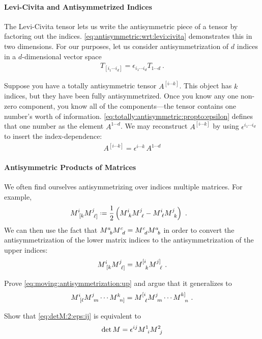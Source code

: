 \documentclass[12pt, oneside]{report}    %
\begin{document}
\paragraph{Levi-Civita and Antisymmetrized Indices}
The Levi-Civita tensor lets us write the antisymmetric piece of a tensor by factoring out the indices. \eqref{eq:antisymmetric:wrt:levi:civita} demonstrates this in two dimensions. For our purposes, let us consider antisymmetrization of $d$ indices in a $d$-dimensional vector space
\begin{align}
    T_{[i_1\cdots i_d]} = 
    \epsilon_{i_1\cdots i_d}
    T_{1\cdots d} \ .
    \label{eq:totally:antisymmetric:propto:epsilon}
\end{align}
\begin{example}\label{eg:pull:out:epsilon}
Suppose you have a totally antisymmetric tensor $A^{[i\cdots k]}$. This object has $k$ indices, but they have been fully antisymmetrized. Once you know any one non-zero component, you know all of the components---the tensor contains one number's worth of information. \eqref{eq:totally:antisymmetric:propto:epsilon} defines that one number as the element $A^{1\cdots d}$. We may reconstruct $A^{[i\cdots k]}$ by using $\epsilon^{i_1\cdots i_d}$ to insert the index-dependence:
\begin{align}
    A^{[i\cdots k]} = \epsilon^{i\cdots k} \, A^{1\cdots d}
\end{align}
\end{example}

\paragraph{Antisymmetric Products of Matrices}
We often find ourselves antisymmetrizing over indices multiple matrices. For example,
\begin{align}
    M\aij{i}{[k}M\aij{j}{\ell]} &\defeq
    \frac{1}{2}
    \left(M\aij{i}{k}M\aij{j}{\ell} - M\aij{i}{\ell}M\aij{j}{k} \right) \ .
\end{align}
We can then use the fact that $M\aij{a}{b}M\aij{c}{d} = M\aij{c}{d} M\aij{a}{b}$ in order to convert the antisymmetrization of the lower matrix indices to the antisymmetrization of the upper indices:
\begin{align}
    M\aij{i}{[k}M\aij{j}{\ell]}
    = 
    M\aij{[i}{k}M\aij{j]}{\ell} \ .
    \label{eq:moving:antisymmetrization:up}
\end{align}
\begin{exercise}
Prove \eqref{eq:moving:antisymmetrization:up} and argue that it generalizes to
\begin{align}
   M\aij{i}{[\ell} M\aij{j}{m} \cdots M\aij{k}{n]} 
   =
   M\aij{[i}{\ell} M\aij{j}{m} \cdots M\aij{k]}{n} \ .
   \label{eq:antisymmetrize:goes:up}
\end{align}
\end{exercise}
\begin{exercise}
Show that \eqref{eq:detM:2:eps:ij} is equivalent to 
\begin{align}
    \det M = \epsilon^{ij} M\aij{1}{i}M\aij{2}{j}
\end{align}

\end{exercise}
\end{document}
